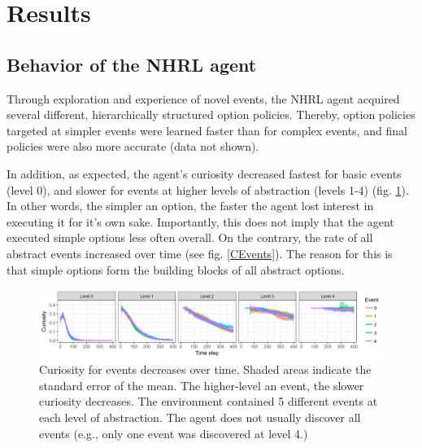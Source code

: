 \documentclass{article}
\begin{document}
\section{Results}

\subsection{Behavior of the NHRL agent} \label{Results NHRL}

Through exploration and experience of novel events, the NHRL agent acquired several different, hierarchically structured option policies. Thereby, option policies targeted at simpler events were learned faster than for complex events, and final policies were also more accurate (data not shown).

In addition, as expected, the agent's curiosity decreased fastest for basic events (level 0), and slower for events at higher levels of abstraction (levels 1-4) (fig. \ref{CuriosityFigure}). In other words, the simpler an option, the faster the agent lost interest in executing it for it's own sake. Importantly, this does not imply that the agent executed simple options less often overall. On the contrary, the rate of all abstract events increased over time (see fig. \ref{CEvents}). The reason for this is that simple options form the building blocks of all abstract options.


\begin{figure}[h]
	\centering
	\includegraphics[width=\linewidth]{ACuriosity.png}
	\caption{Curiosity for events decreases over time. Shaded areas indicate the standard error of the mean. The higher-level an event, the slower curiosity decreases. The environment contained 5 different events at each level of abstraction. The agent does not usually discover all events (e.g., only one event was discovered at level 4.)}
	\label{CuriosityFigure}
\end{figure}
\end{document}
